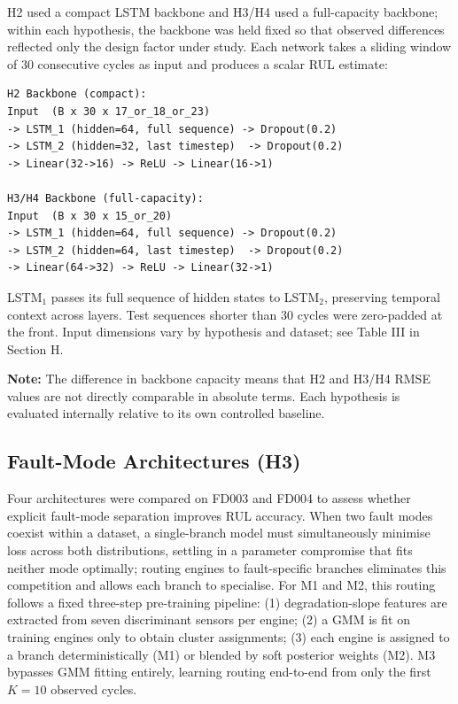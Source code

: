 \documentclass[preprint,10pt]{elsarticle}
\begin{document}
H2 used a compact LSTM backbone and H3/H4 used a full-capacity backbone; within each hypothesis, the backbone was held fixed so that observed differences reflected only the design factor under study. Each network takes a sliding window of 30 consecutive cycles as input and produces a scalar RUL estimate:
{\small\begin{verbatim}
H2 Backbone (compact):
Input  (B x 30 x 17_or_18_or_23)
-> LSTM_1 (hidden=64, full sequence) -> Dropout(0.2)
-> LSTM_2 (hidden=32, last timestep)  -> Dropout(0.2)
-> Linear(32->16) -> ReLU -> Linear(16->1)

H3/H4 Backbone (full-capacity):
Input  (B x 30 x 15_or_20)
-> LSTM_1 (hidden=64, full sequence) -> Dropout(0.2)
-> LSTM_2 (hidden=64, last timestep)  -> Dropout(0.2)
-> Linear(64->32) -> ReLU -> Linear(32->1)
\end{verbatim}
}

LSTM$_1$ passes its full sequence of hidden states to LSTM$_2$, preserving temporal context across layers. Test sequences shorter than 30 cycles were zero-padded at the front. Input dimensions vary by hypothesis and dataset; see Table III in Section H.

\textbf{Note:} The difference in backbone capacity means that H2 and H3/H4 RMSE values are not directly comparable in absolute terms. Each hypothesis is evaluated internally relative to its own controlled baseline.

\subsection{Fault-Mode Architectures (H3)}

Four architectures were compared on FD003 and FD004 to assess whether explicit fault-mode separation improves RUL accuracy. When two fault modes coexist within a dataset, a single-branch model must simultaneously minimise loss across both distributions, settling in a parameter compromise that fits neither mode optimally; routing engines to fault-specific branches eliminates this competition and allows each branch to specialise. For M1 and M2, this routing follows a fixed three-step pre-training pipeline: (1) degradation-slope features are extracted from seven discriminant sensors per engine; (2) a GMM is fit on training engines only to obtain cluster assignments; (3) each engine is assigned to a branch deterministically (M1) or blended by soft posterior weights (M2). M3 bypasses GMM fitting entirely, learning routing end-to-end from only the first $K = 10$ observed cycles.
\end{document}
